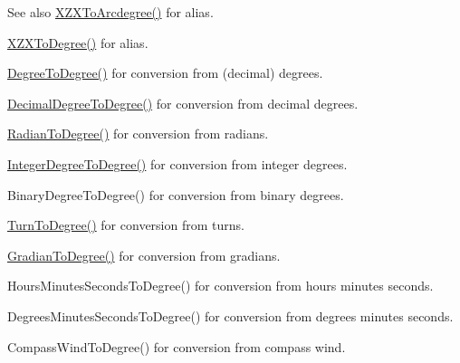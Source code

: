 \begin{DoxySeeAlso}{See also}
\mbox{\hyperlink{group___e_g_x_math-_angle_conversions-_x_z_x_gade03c99ea870f58dcebd6307beed2364}{X\+Z\+X\+To\+Arcdegree()}} for alias. 

\mbox{\hyperlink{group___e_g_x_math-_angle_conversions-_x_z_x_gaf91d111a3f3558dcd147d3832afc1fd6}{X\+Z\+X\+To\+Degree()}} for alias. 

\mbox{\hyperlink{group___e_g_x_math-_angle_conversions-_degree_gaca157e7d3e99a46a11a04b92680d2574}{Degree\+To\+Degree()}} for conversion from (decimal) degrees. 

\mbox{\hyperlink{group___e_g_x_math-_angle_conversions-_decimal_degree_ga0aa7f2f5dbb00cf4ab303421c6e33ccf}{Decimal\+Degree\+To\+Degree()}} for conversion from decimal degrees. 

\mbox{\hyperlink{group___e_g_x_math-_angle_conversions-_radian_ga25bbce6cdc1c3621f2a158d320e3bc45}{Radian\+To\+Degree()}} for conversion from radians. 

\mbox{\hyperlink{group___e_g_x_math-_angle_conversions-_integer_degree_gaa9b63c6095fd7f8809fcfa2ba1e62235}{Integer\+Degree\+To\+Degree()}} for conversion from integer degrees. 

Binary\+Degree\+To\+Degree() for conversion from binary degrees. 

\mbox{\hyperlink{group___e_g_x_math-_angle_conversions-_turn_ga19eceb6db54a1cf17789639c2a869cb9}{Turn\+To\+Degree()}} for conversion from turns. 

\mbox{\hyperlink{group___e_g_x_math-_angle_conversions-_gradian_gaa284952274f16d225951cf5139d0ff4e}{Gradian\+To\+Degree()}} for conversion from gradians. 

Hours\+Minutes\+Seconds\+To\+Degree() for conversion from hours minutes seconds. 

Degrees\+Minutes\+Seconds\+To\+Degree() for conversion from degrees minutes seconds. 

Compass\+Wind\+To\+Degree() for conversion from compass wind. 
\end{DoxySeeAlso}
\mbox{\label{group___e_g_x_math-_angle_conversions-_x_z_x_ga61b7b63e9e90044636c79b599e86fa2f}} 
